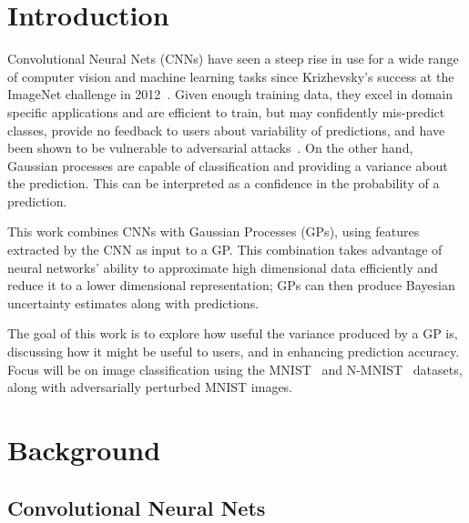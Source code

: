 \documentclass{article}
\begin{document}
\section{Introduction}





\label{sec:intro}

 
Convolutional Neural Nets (CNNs) have seen a steep rise in use for a wide range of computer vision and machine learning tasks since Krizhevsky's success at the ImageNet challenge in 2012~\cite{krizhevsky2012imagenet}. Given enough training data, they excel in domain specific applications and are efficient to train, but may confidently mis-predict classes, provide no feedback to users about variability of predictions, and have been shown to be vulnerable to adversarial attacks~\cite{szegedy2013intriguing}. On the other hand, Gaussian processes are capable of classification and providing a variance about the prediction. This can be interpreted as a confidence in the probability of a prediction.

This work combines CNNs with Gaussian Processes (GPs), using features extracted by the CNN as input to a GP. This combination takes advantage of neural networks' ability to approximate high dimensional data efficiently and reduce it to a lower dimensional representation; GPs can then produce Bayesian uncertainty estimates along with predictions.

The goal of this work is to explore how useful the variance produced by a GP is, discussing how it might be useful to users, and in enhancing prediction accuracy. Focus will be on image classification using the MNIST~\cite{lecun1998gradient} and N-MNIST~\cite{basu2017learning} datasets, along with adversarially perturbed MNIST images.


\section{Background}
\label{sec:background}
\subsection{Convolutional Neural Nets}
\label{sec:background:cnn}
\end{document}

